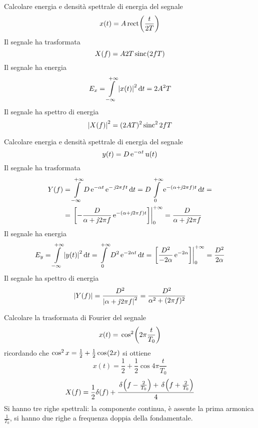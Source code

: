 \begin{esercizio}
Calcolare energia e densità spettrale di energia del segnale
\[
	x(t)=A\rect{\frac{t}{2T}}
\]
Il segnale ha trasformata 
\[
	X(f)=A 2 T \sinc{2 f T}
\]
Il segnale ha energia
\[
	E_x=\intinf{\abs{x(t)}^2}{t}=2 A^2 T
\]
Il segnale ha spettro di energia
\[
	\abs{X(f)}^2=(2 A T)^2\Sinc^2{2 f T}
\]
\end{esercizio}

\begin{esercizio}
Calcolare energia e densità spettrale di energia del segnale
\[
	y(t)=D\e{-\alpha t}\step(t)
\]
Il segnale ha trasformata
\begin{align*}
	Y(f)&=\intinf{ D\e{-\alpha t}\e{-\imath 2\pi f t}}{t}=D\intd{0}{+\infty}{\e{-(\alpha+\imath 2\pi f)t}}{t}=\\
	&=\bound{0}{+\infty}{-\frac{D}{\alpha+\imath 2\pi f}\e{-(\alpha+\imath 2\pi f)t}}=\frac{D}{\alpha+\imath 2\pi f}
\end{align*}
Il segnale ha energia
\[
	E_y=\intinf{\abs{y(t)}^2}{t}=\intd{0}{+\infty}{D^2\e{-2\alpha t}}{t}=\bound{0}{+\infty}{\frac{D^2}{-2\alpha}\e{-2\alpha}}=\frac{D^2}{2\alpha}
\]
Il segnale ha spettro di energia
\[
	\abs{Y(f)}=\frac{D^2}{\abs{\alpha+\imath 2\pi f}^2}=\frac{D^2}{\alpha^2+(2\pi f)^2}
\]
\end{esercizio}

\begin{esercizio}
Calcolare la trasformata di Fourier del segnale
\[
	x(t)=\f{\Cos^2}{2\pi\frac{t}{T_0}}
\]
ricordando che $\Cos^2 x=\frac{1}{2}+\frac{1}{2}\cos{2x}$ si ottiene
\[
	x(t)=\frac{1}{2}+\frac{1}{2}\cos{4\pi\frac{t}{T_0}}
\]
\[
	X(f)=\frac{1}{2}\delta(f)+\frac{\f{\delta}{f-\frac{2}{T_0}}+\f{\delta}{f+\frac{2}{T_0}}}{4}
\]
Si hanno tre righe spettrali: la componente continua, è assente la prima armonica $\frac{1}{T_0}$, si hanno due righe a frequenza doppia della fondamentale.
\begin{figure}[!ht]
	\centering
\end{figure}
\end{esercizio}
